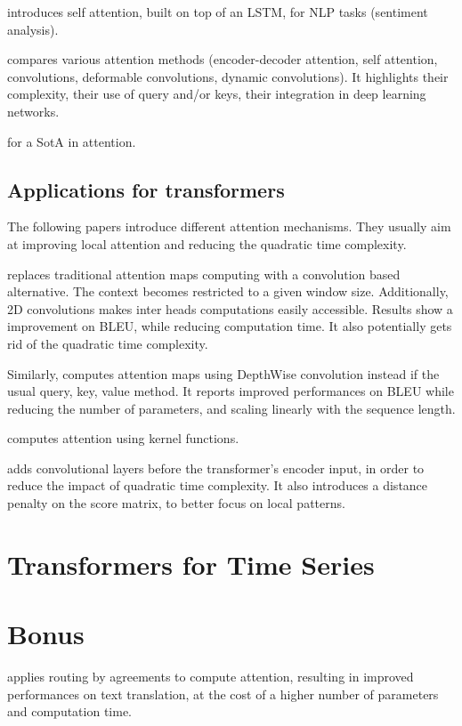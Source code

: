 \documentclass{article}
\begin{document}
    \cite{Cheng2016LongSM} introduces self attention, built on top of an LSTM, for NLP tasks (sentiment analysis).

    \cite{Zhu2019AnES} compares various attention methods (encoder-decoder attention, self attention, convolutions, deformable convolutions, dynamic convolutions). It highlights their complexity, their use of query and/or keys, their integration in deep learning networks.

    \cite{weng2018attention} for a SotA in attention.

    \subsection{Applications for transformers}
    The following papers introduce different attention mechanisms. They usually aim at improving local attention and reducing the quadratic time complexity.

    \cite{Yang2019ConvolutionalSN} replaces traditional attention maps computing with a convolution based alternative. The context becomes restricted to a given window size. Additionally, 2D convolutions makes inter heads computations easily accessible. Results show a improvement on BLEU, while reducing computation time. It also potentially gets rid of the quadratic time complexity.

    Similarly, \cite{Wu2019PayLA} computes attention maps using DepthWise convolution instead if the usual query, key, value method. It reports improved performances on BLEU while reducing the number of parameters,
    and scaling linearly with the sequence length.

    \cite{Tsai2019TransformerDA} computes attention using kernel functions.
    
    \cite{Gangi2019AdaptingTT} adds convolutional layers before the transformer's encoder input, in order to reduce the impact of quadratic time complexity. It also introduces a distance penalty on the score matrix, to better focus on local patterns.
    

\section{Transformers for Time Series}

\section{Bonus}

    \cite{Li2019InformationAF} applies routing by agreements to compute attention, resulting in improved performances on text translation, at the cost of a higher number of parameters and computation time.




\end{document}
